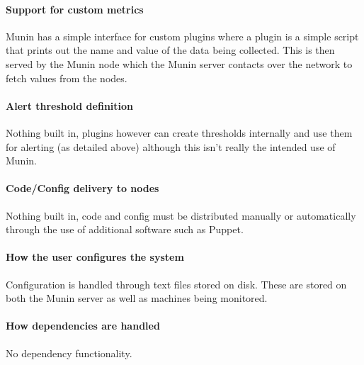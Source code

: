 \documentclass[10pt]{article}
\begin{document}
	\paragraph{Support for custom metrics}
	Munin has a simple interface for custom plugins where a plugin is a simple script that prints out the
	name and value of the data being collected.  This is then served by the Munin node which the Munin
	server contacts over the network to fetch values from the nodes.
	
	\paragraph{Alert threshold definition}
	Nothing built in, plugins however can create thresholds internally and use them for alerting (as
	detailed above) although this isn't really the intended use of Munin.
	
	\paragraph{Code/Config delivery to nodes}
	Nothing built in, code and config must be distributed manually or automatically through the use of
	additional software such as Puppet.
	
	\paragraph{How the user configures the system}
	Configuration is handled through text files stored on disk.  These are stored on both the Munin 
	server as well as machines being monitored.
	
	\paragraph{How dependencies are handled}
	No dependency functionality.
\end{document}

